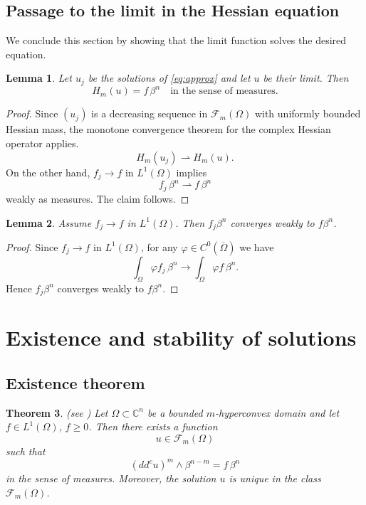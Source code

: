 \documentclass[10pt,a4paper]{amsart}
\newtheorem{theorem}{Theorem}[section]
\newtheorem{lemma}[theorem]{Lemma}
\newcommand{\ddc}{dd^c}
\begin{document}
	\subsection{Passage to the limit in the Hessian equation}
	
	We conclude this section by showing that the limit function solves the desired equation.
	
	\begin{lemma}\label{lem:limit}
		Let $u_j$ be the solutions of \eqref{eq:approx} and let $u$ be their limit.
		Then
		\[
		H_m(u) = f \, \beta^n
		\quad \text{in the sense of measures}.
		\]
	\end{lemma}
	
	\begin{proof}
		Since $(u_j)$ is a decreasing sequence in $\mathcal F_m(\Omega)$ with
		uniformly bounded Hessian mass, the monotone convergence theorem for
		the complex Hessian operator applies.
		\[
		H_m(u_j) \rightharpoonup H_m(u).
		\]
		On the other hand, $f_j \to f$ in $L^1(\Omega)$ implies
		\[
		f_j \, \beta^n \rightharpoonup f \, \beta^n
		\]
		weakly as measures.
		The claim follows.
	\end{proof}
	\begin{lemma}\label{lem:L1limit}
		Assume $f_j\to f$ in $L^1(\Omega)$.
		Then $f_j\beta^n$ converges weakly to $f\beta^n$.
	\end{lemma}
	\begin{proof}
		Since $f_j \to f$ in $L^1(\Omega)$, for any $\varphi \in C^0(\overline{\Omega})$ we have
		\[
		\int_\Omega \varphi f_j \,\beta^n \to \int_\Omega \varphi f \,\beta^n.
		\]
		Hence $f_j\beta^n$ converges weakly to $f\beta^n$.
	\end{proof}
	
	
	
	\section{Existence and stability of solutions}
	
	
	
	
	\subsection{Existence theorem}
	
	\begin{theorem}\label{thm:existence}
		(see \cite{Lu})
		Let $\Omega \subset \mathbb{C}^n$ be a bounded $m$-hyperconvex domain and let
		$f \in L^1(\Omega)$, $f \ge 0$.
		Then there exists a function
		\[
		u \in \mathcal{F}_m(\Omega)
		\]
		such that
		\begin{equation}\label{eq:existence}
			(\ddc u)^m \wedge \beta^{n-m} = f \, \beta^n
		\end{equation}
		in the sense of measures.
		Moreover, the solution $u$ is unique in the class $\mathcal{F}_m(\Omega)$.
	\end{theorem}
	
\end{document}

